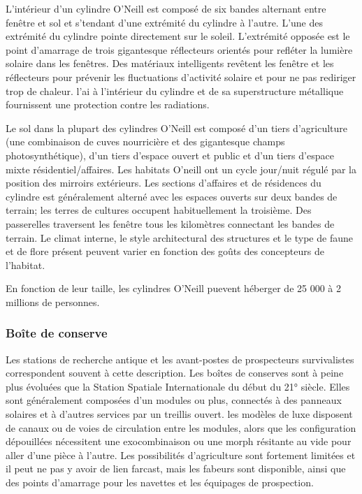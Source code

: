L'intérieur d'un cylindre O'Neill est composé de six bandes alternant entre fenêtre et sol et s'tendant d'une extrémité du cylindre à l'autre. L'une des extrémité du cylindre pointe directement sur le soleil. L'extrémité opposée est le point d'amarrage de trois gigantesque réflecteurs orientés pour refléter la lumière solaire dans les fenêtres. Des matériaux intelligents revêtent les fenêtre et les réflecteurs pour prévenir les fluctuations d'activité solaire et pour ne pas rediriger trop de chaleur. l'ai à l'intérieur du cylindre et de sa superstructure métallique fournissent une protection contre les radiations. 

Le sol dans la plupart des cylindres O'Neill est composé d'un tiers d'agriculture (une combinaison de cuves nourricière et des gigantesque champs photosynthétique), d'un tiers d'espace ouvert et public et d'un tiers d'espace mixte résidentiel/affaires. Les habitats O'neill ont un cycle jour/nuit régulé par la position des mirroirs extérieurs. Les sections d'affaires et de résidences du cylindre est généralement alterné avec les espaces ouverts sur deux bandes de terrain; les terres de cultures occupent habituellement la troisième. Des passerelles traversent les fenêtre tous les kilomètres connectant les bandes de terrain. Le climat interne, le style architectural des structures et le type de faune et de flore présent peuvent varier en fonction des goûts des concepteurs de l'habitat. 

En fonction de leur taille, les cylindres O'Neill puevent héberger de 25 000 à 2 millions de personnes. 

\subsubsection{Boîte de conserve} 

Les stations de recherche antique et les avant-postes de prospecteurs survivalistes correspondent souvent à cette description. Les boîtes de conserves sont à peine plus évoluées que la Station Spatiale Internationale du début du 21° siècle. Elles sont généralement composées d'un modules ou plus, connectés à des panneaux solaires et à d'autres services par un treillis ouvert. les modèles de luxe disposent de canaux ou de voies de circulation entre les modules, alors que les configuration dépouillées nécessitent une exocombinaison ou une morph résitante au vide pour aller d'une pièce à l'autre. Les possibilités d'agriculture sont fortement limitées et il peut ne pas y avoir de lien farcast, mais les fabeurs sont disponible, ainsi que des points d'amarrage pour les navettes et les équipages de prospection. 

